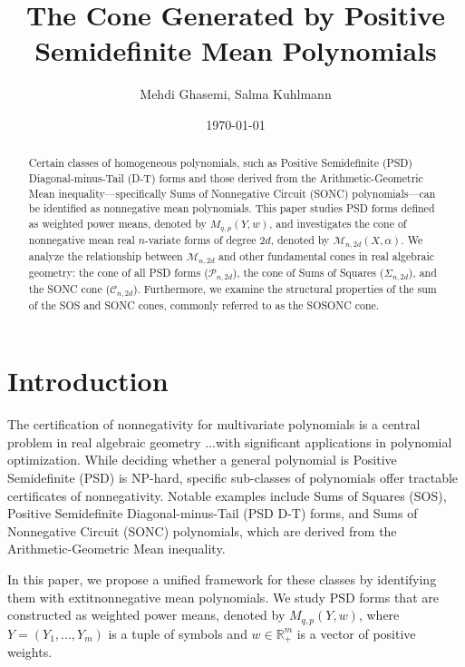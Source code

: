 \documentclass{article}
\title{The Cone Generated by Positive Semidefinite Mean Polynomials}
\author{Mehdi Ghasemi, Salma Kuhlmann}
\date{\today}
\begin{document}
\maketitle

\begin{abstract}
Certain classes of homogeneous polynomials, such as Positive Semidefinite (PSD) Diagonal-minus-Tail (D-T) 
forms and those derived from the Arithmetic-Geometric Mean inequality—specifically Sums of 
Nonnegative Circuit (SONC) polynomials—can be identified as nonnegative mean polynomials. 
This paper studies PSD forms defined as weighted power means, denoted by $M_{q,p}(Y,w)$, and investigates 
the cone of nonnegative mean real $n$-variate forms of degree $2d$, denoted by $\mathcal{M}_{n,2d}(X,\alpha)$. 
We analyze the relationship between $\mathcal{M}_{n,2d}$ and other fundamental cones in real algebraic geometry: 
the cone of all PSD forms ($\mathcal{P}_{n,2d}$), the cone of Sums of Squares ($\Sigma_{n,2d}$), and the SONC 
cone ($\mathcal{C}_{n,2d}$). Furthermore, we examine the structural properties of the sum of the SOS and SONC 
cones, commonly referred to as the SOSONC cone.
\end{abstract}

\section{Introduction}\label{s01}
The certification of nonnegativity for multivariate polynomials is a central problem in real algebraic geometry 
...with significant applications in polynomial optimization. While deciding whether a general polynomial is 
Positive Semidefinite (PSD) is NP-hard, specific sub-classes of polynomials offer tractable certificates of 
nonnegativity. Notable examples include Sums of Squares (SOS), Positive Semidefinite 
Diagonal-minus-Tail (PSD D-T) forms, and Sums of Nonnegative Circuit (SONC) polynomials, which are derived 
from the Arithmetic-Geometric Mean inequality.

In this paper, we propose a unified framework for these classes by identifying them with 
	extit{nonnegative mean polynomials}. We study PSD forms that are constructed as weighted power means, 
denoted by $M_{q,p}(Y,w)$, where $Y = (Y_{1},...,Y_{m})$ is a tuple of symbols and $w \in \mathbb{R}_{+}^{m}$ 
is a vector of positive weights.
\end{document}

